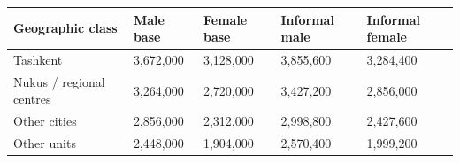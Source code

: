 \begingroup\fontsize{11}{13.2}\selectfont
\begin{longtable}{p{} p{} p{} p{} p{}}
\toprule
Geographic class & Male base & Female base & Informal male & Informal female \\
\midrule
\endhead
Tashkent & 3,672,000 & 3,128,000 & 3,855,600 & 3,284,400 \\
Nukus / regional centres & 3,264,000 & 2,720,000 & 3,427,200 & 2,856,000 \\
Other cities & 2,856,000 & 2,312,000 & 2,998,800 & 2,427,600 \\
Other units & 2,448,000 & 1,904,000 & 2,570,400 & 1,999,200 \\
\bottomrule
\end{longtable}
\endgroup
